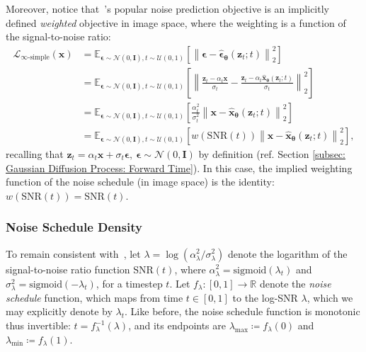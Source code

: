 Moreover, notice that~\cite{ho2020denoising}'s popular noise prediction objective is an implicitly defined \textit{weighted} objective in image space, where the weighting is a function of the signal-to-noise ratio:
%
\begin{align}
    \mathcal{L}_{\infty\text{-}\mathrm{simple}}(\mathbf{x}) & = \mathbb{E}_{\boldsymbol{\epsilon} \sim \mathcal{N}(0,\mathbf{I}), t \sim \mathcal{U}(0,1)} \left[ \left\| \boldsymbol{\epsilon} - \hat{\boldsymbol{\epsilon}}_{\boldsymbol{\theta}}(\mathbf{z}_t;t) \right\|^2_2 \right]
    \\[5pt] & = \mathbb{E}_{\boldsymbol{\epsilon} \sim \mathcal{N}(0,\mathbf{I}), t \sim \mathcal{U}(0,1)} \left[ \left\| \frac{\mathbf{z}_t - \alpha_t\mathbf{x}}{\sigma_t} - \frac{\mathbf{z}_t - \alpha_t\hat{\mathbf{x}}_{\boldsymbol{\theta}}(\mathbf{z}_t;t)}{\sigma_t} \right\|^2_2 \right]
    \\[5pt] & = \mathbb{E}_{\boldsymbol{\epsilon} \sim \mathcal{N}(0,\mathbf{I}), t \sim \mathcal{U}(0,1)} \left[ \frac{\alpha_t^2}{\sigma_t^2} \left\| \mathbf{x} - \hat{\mathbf{x}}_{\boldsymbol{\theta}}(\mathbf{z}_t;t) \right\|^2_2 \right]
    \\[5pt] & = \mathbb{E}_{\boldsymbol{\epsilon} \sim \mathcal{N}(0,\mathbf{I}), t \sim \mathcal{U}(0,1)} \left[ w(\mathrm{SNR}(t)) \left\| \mathbf{x} - \hat{\mathbf{x}}_{\boldsymbol{\theta}}(\mathbf{z}_t;t) \right\|^2_2 \right], 
\end{align}
%
recalling that $\mathbf{z}_t = \alpha_t \mathbf{x} + \sigma_t \boldsymbol{\epsilon}, \ \boldsymbol{\epsilon} \sim \mathcal{N}(0,\mathbf{I})$ by definition (ref. Section \ref{subsec: Gaussian Diffusion Process: Forward Time}). In this case, the implied weighting function of the noise schedule (in image space) is the identity: $w(\mathrm{SNR}(t)) = \mathrm{SNR}(t)$.
%
\subsubsection{Noise Schedule Density}
\label{subsubsec: noise schedule density}
%
To remain consistent with~\cite{kingma2023understanding}, let $\lambda = \log(\alpha_\lambda^2 / \sigma^2_\lambda) $ denote the logarithm of the signal-to-noise ratio function $\mathrm{SNR}(t)$, where $\alpha_\lambda^2 =  \mathrm{sigmoid}(\lambda_t)$ and $\sigma_\lambda^2 =  \mathrm{sigmoid}(-\lambda_t)$, for a timestep $t$. Let $f_\lambda : [0,1] \rightarrow \mathbb{R}$ denote the \textit{noise schedule} function, which maps from time $t \in [0,1]$ to the log-SNR $\lambda$, which we may explicitly denote by $\lambda_t$. Like before, the noise schedule function is monotonic thus invertible: $t = f^{-1}_\lambda(\lambda)$, and its endpoints are $\lambda_\mathrm{max} \coloneqq f_\lambda(0)$ and $\lambda_\mathrm{min} \coloneqq f_\lambda(1)$.

